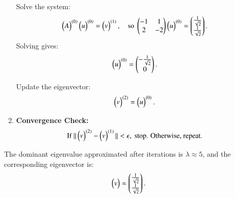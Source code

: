 \documentclass[journal,12pt,onecolumn]{IEEEtran}
\theoremstyle{remark}
\begin{document}
\begin{enumerate}
    Solve the system:
    \begin{align*}
    \begin{pmatrix}A\end{pmatrix}^{(0)}\begin{pmatrix}u\end{pmatrix}^{(0)} &= \begin{pmatrix}v\end{pmatrix}^{(1)}, \quad \text{so } 
    \begin{pmatrix}
    -1 & 1 \\
    2 & -2
    \end{pmatrix}
    \begin{pmatrix}u\end{pmatrix}^{(0)} = 
    \begin{pmatrix}
    \frac{1}{\sqrt{2}} \\
    \frac{1}{\sqrt{2}}
    \end{pmatrix}.
    \end{align*}
    Solving gives:
    \begin{align*}
    \begin{pmatrix}u\end{pmatrix}^{(0)} &= 
    \begin{pmatrix}
    -\frac{1}{\sqrt{2}} \\
    0
    \end{pmatrix}.
    \end{align*}
    
    Update the eigenvector:
    \begin{align*}
    \begin{pmatrix}v\end{pmatrix}^{(2)} &= \begin{pmatrix}u\end{pmatrix}^{(0)}.
    \end{align*}

    \item \textbf{Convergence Check:}
    \begin{align*}
        &\text{If } \| \begin{pmatrix}v\end{pmatrix}^{(2)} - \begin{pmatrix}v\end{pmatrix}^{(1)} \| < \epsilon, \text{ stop. Otherwise, repeat.}
    \end{align*}
\end{enumerate}

The dominant eigenvalue approximated after iterations is \(\lambda \approx 5\), and the corresponding eigenvector is:
\begin{align*}
\begin{pmatrix}v\end{pmatrix} &\approx 
\begin{pmatrix}
\frac{1}{\sqrt{2}} \\
\frac{1}{\sqrt{2}}
\end{pmatrix}.
\end{align*}
\vspace*{\fill}  
\begin{center}  
\end{center}
\vspace*{\fill}
\end{document}
